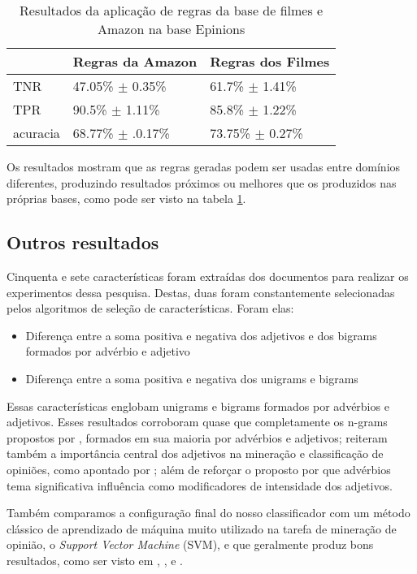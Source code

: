 \documentclass[template.tex]{subfiles}
\begin{document}
\begin{table}[!h]
    \begin{tabular}{lll}
    ~         		& Regras da Amazon 					& Regras dos Filmes \\ \hline
    TNR 			& 47.05\% $\pm$ 0.35\%           & 61.7\% $\pm$ 1.41\%    \\
    TPR    		& 90.5\% $\pm$ 1.11\% 				& 85.8\% $\pm$ 1.22\%   \\
    acuracia  	& 68.77\% $\pm$ .0.17\%         	& 73.75\% $\pm$ 0.27\%    \\
    \end{tabular}
    \caption{Resultados da aplicação de regras da base de filmes e Amazon na base Epinions}
	\label{table:epinions}
\end{table}

Os resultados mostram que as regras geradas podem ser usadas entre domínios diferentes, produzindo resultados próximos ou melhores que os produzidos nas próprias bases, como pode ser visto na tabela \ref{table:epinions}.

\subsection{Outros resultados}

Cinquenta e sete características foram extraídas dos documentos para realizar os experimentos dessa pesquisa. Destas, duas foram constantemente selecionadas pelos algoritmos de seleção de características. Foram elas:

\begin{itemize}
\item Diferença entre a soma positiva e negativa dos adjetivos e dos bigrams formados por advérbio e adjetivo
\item Diferença entre a soma positiva e negativa dos unigrams e bigrams
\end{itemize}

Essas características englobam unigrams e bigrams formados por advérbios e adjetivos. Esses resultados corroboram quase que completamente os n-grams propostos por \cite{turney2002thumbs}, formados em sua maioria por advérbios e adjetivos; reiteram também a importância central dos adjetivos na mineração e classificação de opiniões, como apontado por \cite{voll2007not}; além de reforçar o proposto por \cite{benamara2007sentiment} que advérbios tema significativa influência como modificadores de intensidade dos adjetivos.

Também comparamos a configuração final do nosso classificador com um método clássico de aprendizado de máquina muito utilizado na tarefa de mineração de opinião, o \textit{Support Vector Machine} (SVM), e que geralmente produz bons resultados, como ser visto em \cite{moraes2012document}, \cite{pang2002thumbs}, \cite{pang2004sentimental} e \cite{wilson2004just}. 
\end{document}
